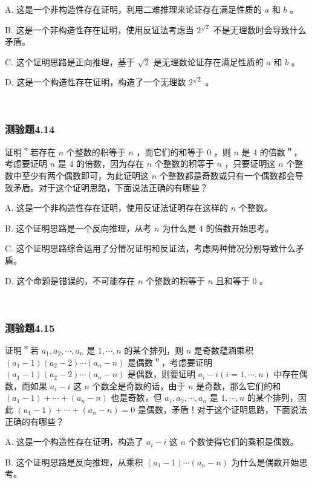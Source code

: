 \documentclass[UTF8, heading=true]{ctexart}
\begin{document}
A. 这是一个非构造性存在证明，利用二难推理来论证存在满足性质的 $a$ 和 $b$ 。

B. 这是一个非构造性存在证明，使用反证法考虑当 $2^{\sqrt{2}}$ 不是无理数时会导致什么矛盾。

C. 这个证明思路是正向推理，基于 $\sqrt{2}$ 是无理数论证存在满足性质的 $a$ 和 $b$ 。

D. 这是一个构造性存在证明，构造了一个无理数 $2^{\sqrt{2}}$ 。

\textcolor{white}{答案：AC}


\subsubsection{测验题4.14}

证明＂若存在 $n$ 个整数的积等于 $n$ ，而它们的和等于 0 ，则 $n$ 是 4 的倍数＂，考虑要证明 $n$ 是 4 的倍数，因为存在 $n$ 个整数的积等于 $n$ ，只要证明这 $n$ 个整数中至少有两个偶数即可，为此证明这 $n$ 个整数都是奇数或只有一个偶数都会导致矛盾。对于这个证明思路，下面说法正确的有哪些？

A. 这是一个非构造性存在证明，使用反证法证明存在这样的 $n$ 个整数。

B. 这个证明思路是一个反向推理，从考 $n$ 为什么是 4 的倍数开始思考。

C. 这个证明思路综合运用了分情况证明和反证法，考虑两种情况分别导致什么矛盾。

D.  这个命题是错误的，不可能存在 $n$ 个整数的积等于 $n$ 且和等于 0 。

\textcolor{white}{答案：BC}

\subsubsection{测验题4.15}

证明＂若 $a_1, a_2, \cdots, a_n$ 是 $1, \cdots, n$ 的某个排列，则 $n$ 是奇数蕴涵乘积 $\left(a_1-1\right)\left(a_2-2\right) \cdots\left(a_n-n\right)$ 是偶数＂，考虑要证明 $\left(a_1-1\right)\left(a_2-2\right) \cdots\left(a_n-n\right)$ 是偶数，则要证明 $a_i-i(i=1, \cdots, n)$ 中存在偶数，而如果 $a_i-i$ 这 $n$ 个数全是奇数的话，由于 $n$ 是奇数，那么它们的和 $\left(a_1-1\right)+\cdots+\left(a_n-n\right)$ 也是奇数，但 $a_1, a_2, \cdots, a_n$ 是 $1, \cdots, n$ 的某个排列，因此 $\left(a_1-1\right)+\cdots+\left(a_n-n\right)=0$ 是偶数，矛盾！对于这个证明思路，下面说法正确的有哪些？

A. 
这是一个构造性存在证明，构造了 $a_i-i$ 这 $n$ 个数使得它们的乘积是偶数。

B. 这个证明思路是反向推理，从乘积 $\left(a_1-1\right) \cdots\left(a_n-n\right)$ 为什么是偶数开始思考。
\end{document}
